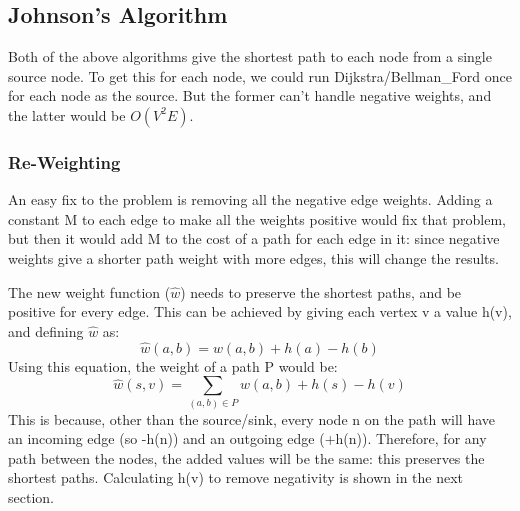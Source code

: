 \subsection{Johnson's Algorithm}
Both of the above algorithms give the shortest path to each node from a single source node. To get this for each node, we could run Dijkstra/Bellman\_Ford once for each node as the source. But the former can't handle negative weights, and the latter would be $O(V^2E)$.

\subsubsection{Re-Weighting}
An easy fix to the problem is removing all the negative edge weights. Adding a constant M to each edge to make all the weights positive would fix that problem, but then it would add M to the cost of a path for each edge in it: since negative weights give a shorter path weight with more edges, this will change the results.

The new weight function ($\hat{w}$) needs to preserve the shortest paths, and be positive for every edge. This can be achieved by giving each vertex v a value h(v), and defining $\hat{w}$ as:
\begin{equation}
    \hat{w}(a,b) = w(a,b) + h(a) - h(b)
\end{equation}
Using this equation, the weight of a path P would be:
\begin{equation}
    \hat{w}(s,v) = \sum_{(a,b) \in P} w(a,b) + h(s) - h(v)
\end{equation}
This is because, other than the source/sink, every node n on the path will have an incoming edge (so -h(n)) and an outgoing edge (+h(n)). Therefore, for any path between the nodes, the added values will be the same: this preserves the shortest paths. Calculating h(v) to remove negativity is shown in the next section.

